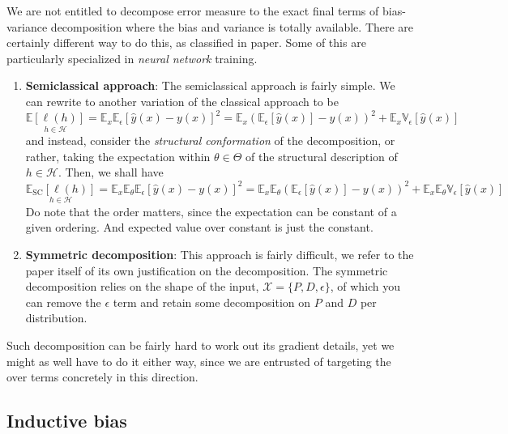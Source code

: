 We are not entitled to decompose error measure to the exact final terms of bias-variance decomposition where the bias and variance is totally available. There are certainly different way to do this, as classified in \cite{adlam2020understandingdoubledescentrequires} paper. Some of this are particularly specialized in \textit{neural network} training. 
\begin{enumerate}[leftmargin=1cm,itemsep=2pt,topsep=1pt]
    \item \textbf{Semiclassical approach}: The semiclassical approach is fairly simple. We can rewrite to another variation of the classical approach to be \begin{equation}
        \underset{h\in\mathcal{H}}{\mathbb{E}[\ell(h)]} = \mathbb{E}_{x}\mathbb{E}_{\epsilon}\left[\hat{y}(x)-y(x)\right]^{2} = \mathbb{E}_{x}\left(\mathbb{E}_{\epsilon}[\hat{y}(x)]-y(x)\right)^{2} + \mathbb{E}_{x}\mathbb{V}_{\epsilon}\left[\hat{y}(x)\right]  
    \end{equation}
    and instead, consider the \textit{structural conformation} of the decomposition, or rather, taking the expectation within $\theta\in \Theta$ of the structural description of $h\in\mathcal{H}$. Then, we shall have 
    \begin{equation}
        \underset{h\in\mathcal{H}}{\mathbb{E}_{\mathrm{SC}}[\ell(h)]} = \mathbb{E}_{x}\mathbb{E}_{\theta}\mathbb{E}_{\epsilon}\left[\hat{y}(x)-y(x)\right]^{2} = \mathbb{E}_{x}\mathbb{E}_{\theta}\left(\mathbb{E}_{\epsilon}[\hat{y}(x)]-y(x)\right)^{2} + \mathbb{E}_{x}\mathbb{E}_{\theta}\mathbb{V}_{\epsilon}\left[\hat{y}(x)\right]
    \end{equation}
    Do note that the order matters, since the expectation can be constant of a given ordering. And expected value over constant is just the constant. 
    \item \textbf{Symmetric decomposition}: This approach is fairly difficult, we refer to the paper itself of its own justification on the decomposition. The symmetric decomposition relies on the shape of the input, $\mathcal{X}=\{P,D,\epsilon\}$, of which you can remove the $\epsilon$ term and retain some decomposition on $P$ and $D$ per distribution. 
\end{enumerate}
Such decomposition can be fairly hard to work out its gradient details, yet we might as well have to do it either way, since we are entrusted of targeting the over terms concretely in this direction. 

\subsection{Inductive bias}

